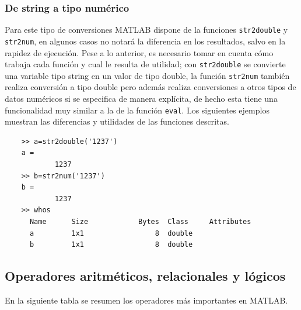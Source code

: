 \subsubsection{De string a tipo numérico}

Para este tipo de conversiones MATLAB dispone de la funciones \texttt{str2double} y \texttt{str2num}, 
en algunos casos no notará la diferencia en los resultados, salvo en la rapidez de ejecución. Pese a lo 
anterior, es necesario tomar en cuenta cómo trabaja cada función y cual le resulta de utilidad; 
con \texttt{str2double} se convierte una variable tipo string en un valor de tipo double, 
la función \texttt{str2num} también realiza conversión a tipo double pero además realiza conversiones 
a otros tipos de datos numéricos si se especifica de manera explícita, de hecho esta tiene una 
funcionalidad muy similar a la de la función \texttt{eval}. Los siguientes ejemplos muestran las 
diferencias y utilidades de las funciones descritas.


\begin{verbatim}
	>> a=str2double('1237')
	a =
	        1237
	>> b=str2num('1237')
	b =
	        1237
	>> whos
	  Name      Size            Bytes  Class     Attributes
	  a         1x1                 8  double              
	  b         1x1                 8  double     
\end{verbatim}


\subsection{Operadores aritméticos, relacionales y lógicos}

En la siguiente tabla se resumen los operadores más importantes en MATLAB.

